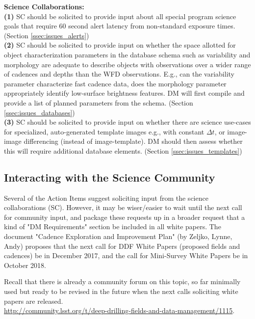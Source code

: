 \documentclass[DM,lsstdraft,toc]{lsstdoc}
\begin{document}
\noindent \textbf{Science Collaborations: } \\
\textbf{(1)} SC should be solicited to provide input about all special program science goals that require 60 second alert latency from non-standard exposure times. (Section \ref{ssec:issues_alerts})\\
\textbf{(2)} SC should be solicited to provide input on whether the space allotted for object characterization parameters in the database schema such as variability and morphology are adequate to describe objects with observations over a wider range of cadences and depths than the WFD observations. E.g., can the variability parameter characterize fast cadence data, does the morphology parameter appropriately identify low-surface brightness features. DM will first compile and provide a list of planned parameters from the schema. (Section \ref{ssec:issues_databases}) \\
\textbf{(3)} SC should be solicited to provide input on whether there are science use-cases for specialized, auto-generated template images e.g., with constant $\Delta t$, or image-image differencing (instead of image-template). DM should then assess whether this will require additional database elements. (Section \ref{ssec:issues_templates}) \\



\subsection{Interacting with the Science Community} \label{ssec:intro_forum}

Several of the Action Items suggest soliciting input from the science collaborations (SC). However, it may be wiser/easier to wait until the next call for community input, and package these requests up in a broader request that a kind of "DM Requirements" section be included in all white papers. The document "Cadence Exploration and Improvement Plan" (by Zeljko, Lynne, Andy) proposes that the next call for DDF White Papers (proposed fields and cadences) be in December 2017, and the call for Mini-Survey White Papers be in October 2018. 

\noindent Recall that there is already a community forum on this topic, so far minimally used but ready to be revised in the future when the next calls soliciting white papers are released. \\ \url{http://community.lsst.org/t/deep-drilling-fields-and-data-management/1115}.
\end{document}
